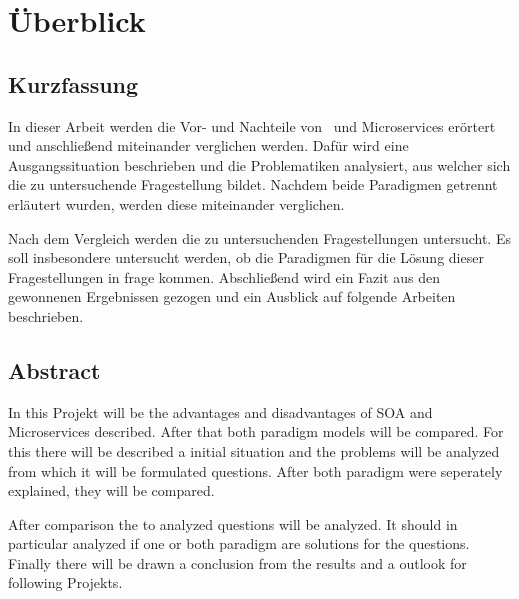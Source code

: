 \chapter*{Überblick}
\section*{Kurzfassung}
In dieser Arbeit werden die Vor- und Nachteile von \SOA\ und Microservices erörtert und anschließend miteinander verglichen werden. Dafür wird eine Ausgangssituation beschrieben und die Problematiken analysiert, aus welcher sich die zu untersuchende Fragestellung bildet. Nachdem beide Paradigmen getrennt erläutert wurden, werden diese miteinander verglichen.

Nach dem Vergleich werden die zu untersuchenden Fragestellungen untersucht. Es soll insbesondere untersucht werden, ob die Paradigmen für die Lösung dieser Fragestellungen in frage kommen. Abschließend wird ein Fazit aus den gewonnenen Ergebnissen gezogen und ein Ausblick auf folgende Arbeiten beschrieben.

\section*{Abstract}
In this Projekt will be the advantages and disadvantages of SOA and Microservices described. After that both paradigm models will be compared. For this there will be described a initial situation and the problems will be analyzed from which it will be formulated questions. After both paradigm were seperately explained, they will be compared.

After comparison the to analyzed questions will be analyzed. It should in particular analyzed if one or both paradigm are solutions for the questions. Finally there will be drawn a conclusion from the results and a outlook for following Projekts.
